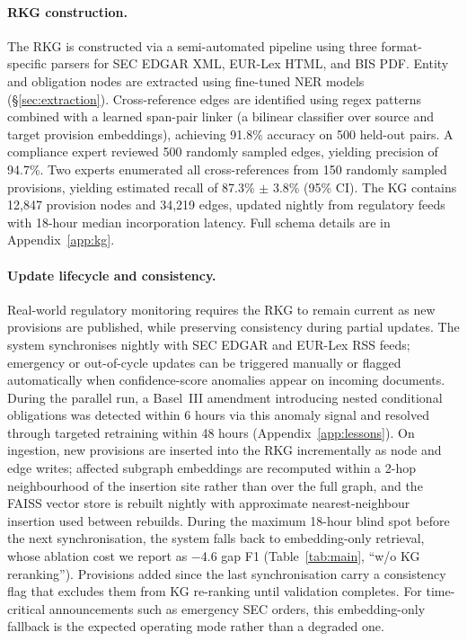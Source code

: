 \documentclass[11pt]{article}
\begin{document}
\paragraph{RKG construction.}  The RKG is constructed via a semi-automated pipeline using three format-specific parsers for SEC EDGAR XML, EUR-Lex HTML, and BIS PDF. Entity and obligation nodes are extracted using fine-tuned NER models (\S\ref{sec:extraction}). Cross-reference edges are identified using regex patterns combined with a learned span-pair linker (a bilinear classifier over source and target provision embeddings), achieving 91.8\% accuracy on 500 held-out pairs. A compliance expert reviewed 500 randomly sampled edges, yielding precision of 94.7\%. Two experts enumerated all cross-references from 150 randomly sampled provisions, yielding estimated recall of 87.3\% $\pm$ 3.8\% (95\% CI). The KG contains 12{,}847 provision nodes and 34{,}219 edges, updated nightly from regulatory feeds with 18-hour median incorporation latency. Full schema details are in Appendix~\ref{app:kg}.

\paragraph{Update lifecycle and consistency.}  Real-world regulatory monitoring requires the RKG to remain current as new provisions are published, while preserving consistency during partial updates. The system synchronises nightly with SEC EDGAR and EUR-Lex RSS feeds; emergency or out-of-cycle updates can be triggered manually or flagged automatically when confidence-score anomalies appear on incoming documents. During the parallel run, a Basel~III amendment introducing nested conditional obligations was detected within 6 hours via this anomaly signal and resolved through targeted retraining within 48 hours (Appendix~\ref{app:lessons}). On ingestion, new provisions are inserted into the RKG incrementally as node and edge writes; affected subgraph embeddings are recomputed within a 2-hop neighbourhood of the insertion site rather than over the full graph, and the FAISS vector store is rebuilt nightly with approximate nearest-neighbour insertion used between rebuilds. During the maximum 18-hour blind spot before the next synchronisation, the system falls back to embedding-only retrieval, whose ablation cost we report as $-$4.6 gap F1 (Table~\ref{tab:main}, ``w/o KG reranking''). Provisions added since the last synchronisation carry a consistency flag that excludes them from KG re-ranking until validation completes. For time-critical announcements such as emergency SEC orders, this embedding-only fallback is the expected operating mode rather than a degraded one.
\end{document}
